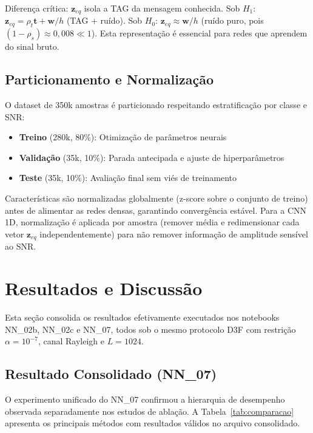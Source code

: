 \documentclass[12pt,a4paper]{article}
\begin{document}
Diferença crítica: $\mathbf{z}_{eq}$ isola a TAG da mensagem conhecida. Sob $H_1$: $\mathbf{z}_{eq} = \rho_t \mathbf{t} + \mathbf{w}/h$ (TAG + ruído). Sob $H_0$: $\mathbf{z}_{eq} \approx \mathbf{w}/h$ (ruído puro, pois $(1-\rho_s) \approx 0{,}008 \ll 1$). Esta representação é essencial para redes que aprendem do sinal bruto.

\subsection{Particionamento e Normalização}

O dataset de 350k amostras é particionado respeitando estratificação por classe e SNR:
\begin{itemize}
  \item \textbf{Treino} (280k, 80\%): Otimização de parâmetros neurais
  \item \textbf{Validação} (35k, 10\%): Parada antecipada e ajuste de hiperparâmetros
  \item \textbf{Teste} (35k, 10\%): Avaliação final sem viés de treinamento
\end{itemize}

Características são normalizadas globalmente (z-score sobre o conjunto de treino) antes de alimentar as redes densas, garantindo convergência estável. Para a CNN 1D, normalização é aplicada por amostra (remover média e redimensionar cada vetor $\mathbf{z}_{eq}$ independentemente) para não remover informação de amplitude sensível ao SNR.


\section{Resultados e Discussão}\label{sec:results}

Esta seção consolida os resultados efetivamente executados nos notebooks NN\_02b, NN\_02c e NN\_07, todos sob o mesmo protocolo D3F com restrição $\alpha=10^{-7}$, canal Rayleigh e $L=1024$.

\subsection{Resultado Consolidado (NN\_07)}

O experimento unificado do NN\_07 confirmou a hierarquia de desempenho observada separadamente nos estudos de ablação. A Tabela~\ref{tab:comparacao} apresenta os principais métodos com resultados válidos no arquivo consolidado.
\end{document}
